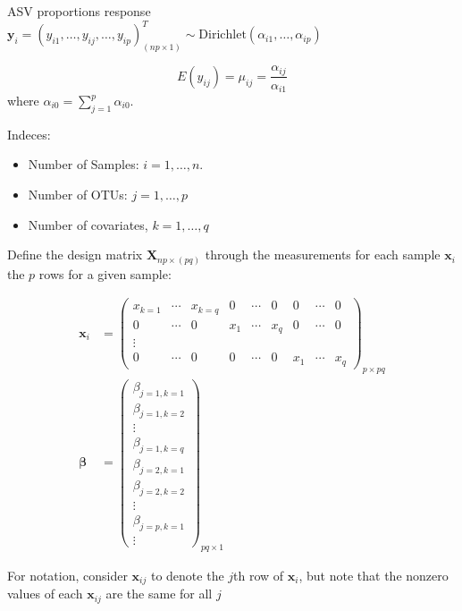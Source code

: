 \documentclass{article}
\begin{document}
ASV proportions response $\mathbf{y}_i = (y_{i1}, \ldots , y_{ij}, \ldots ,  y_{ip})^T_{(np \times 1)} \sim \text{Dirichlet}(\alpha_{i1}, \ldots , \alpha_{ip})$


$$E(y_{ij}) = \mu_{ij} = \frac{\alpha_{ij}}{\alpha_{i1}}$$
where $\alpha_{i0} = \sum_{j = 1}^p \alpha_{i0}$.

\vspace{.5em}
Indeces:
\begin{itemize}
  \item Number of Samples: $i = 1, \ldots , n$.
  \item Number of OTUs: $j = 1, \ldots , p$
  \item Number of covariates, $k = 1, \ldots, q$
\end{itemize}


\vspace{.5em}
Define the design matrix $\mathbf{X}_{np \times (pq)}$ through the measurements for each sample $\mathbf{x}_{i}$ the $p$ rows for a given sample:

\begin{align*}
  \mathbf{x}_i &= \begin{pmatrix}
  x_{k = 1} & \cdots & x_{k = q} & 0 & \cdots & 0 & 0 & \cdots & 0 \\
  0 & \cdots & 0 & x_{1} & \cdots & x_q & 0 & \cdots & 0 \\
   \vdots & & &&& & \\
   0 & \cdots & 0 & 0 & \cdots & 0 & x_1 & \cdots  & x_q
\end{pmatrix}_{p \times pq }\\
 \boldsymbol\beta &= \begin{pmatrix}
 \beta_{j = 1, k = 1}\\
 \beta_{j = 1, k = 2}\\
 \vdots \\
 \beta_{j = 1, k = q}\\
 \beta_{j = 2, k = 1}\\
 \beta_{j = 2, k = 2}\\
 \vdots \\
 \beta_{j = p, k = 1}\\
 \vdots
\end{pmatrix}_{pq \times 1}
\end{align*}



For notation, consider $\mathbf{x}_{ij}$ to denote the $j$th row of $\mathbf{x}_i$, but note that the nonzero values of each $\mathbf{x}_{ij}$ are the same for all $j$
\end{document}
